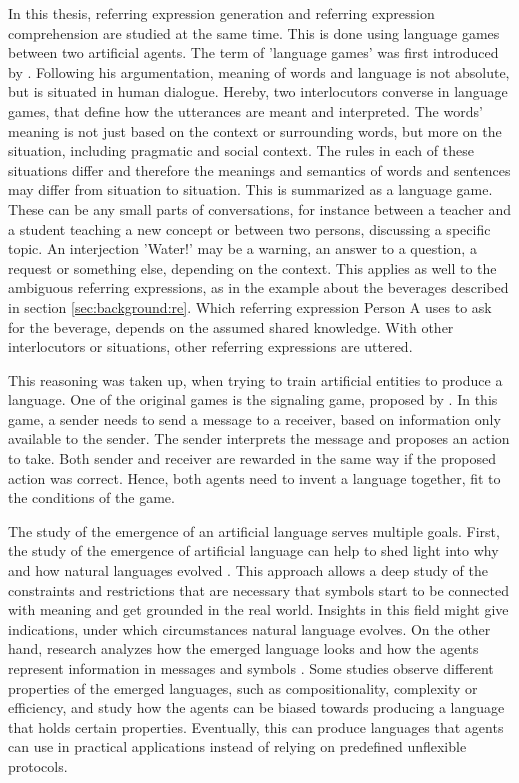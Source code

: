 In this thesis, referring expression generation and referring expression comprehension are studied at the same time.
This is done using language games between two artificial agents.
The term of 'language games' was first introduced by \citet{Wittgenstein1953}.
Following his argumentation, meaning of words and language is not absolute, but is situated in human dialogue.
Hereby, two interlocutors converse in language games, that define how the utterances are meant and interpreted.
The words' meaning is not just based on the context or surrounding words, but more on the situation, including pragmatic and social context.
The rules in each of these situations differ and therefore the meanings and semantics of words and sentences may differ from situation to situation.
This is summarized as a language game.
These can be any small parts of conversations, for instance between a teacher and a student teaching a new concept or between two persons, discussing a specific topic.
An interjection 'Water!' may be a warning, an answer to a question, a request or something else, depending on the context.
This applies as well to the ambiguous referring expressions, as in the example about the beverages described in section \ref{sec:background:re}.
Which referring expression Person A uses to ask for the beverage, depends on the assumed shared knowledge.
With other interlocutors or situations, other referring expressions are uttered.

This reasoning was taken up, when trying to train artificial entities to produce a language.
One of the original games is the signaling game, proposed by \citet{Lewis1969}.
In this game, a sender needs to send a message to a receiver, based on information only available to the sender.
The sender interprets the message and proposes an action to take.
Both sender and receiver are rewarded in the same way if the proposed action was correct.
Hence, both agents need to invent a language together, fit to the conditions of the game.

The study of the emergence of an artificial language serves multiple goals.
First, the study of the emergence of artificial language can help to shed light into why and how natural languages evolved \citep{Bartlett2005,Kirby2002,Kirby2008,Noukhovitch2021}.
This approach allows a deep study of the constraints and restrictions that are necessary that symbols start to be connected with meaning and get grounded in the real world.
Insights in this field might give indications, under which circumstances natural language evolves.
On the other hand, research analyzes how the emerged language looks and how the agents represent information in messages and symbols \citep{Baroni2022,Lazaridou2017,Chaabouni2022,Kottur2017}.
Some studies observe different properties of the emerged languages, such as compositionality, complexity or efficiency, and study how the agents can be biased towards producing a language that holds certain properties.
Eventually, this can produce languages that agents can use in practical applications instead of relying on predefined unflexible protocols.

